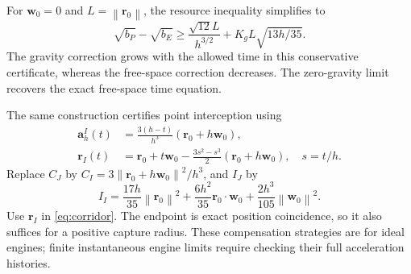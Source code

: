 \documentclass[journal,a4paper]{IEEEtran}
\newcommand{\norm}[1]{\left\|#1\right\|}
\begin{document}
For $\mathbf w_0=0$ and $L=\norm{\mathbf r_0}$, the resource inequality simplifies to
\begin{equation}
 \sqrt{b_P}-\sqrt{b_E}
 \ge\frac{\sqrt{12}L}{h^{3/2}}
       +K_gL\sqrt{13h/35}.
 \label{eq:Jkeplerrestbound}
\end{equation}
The gravity correction grows with the allowed time in this conservative certificate, whereas the free-space correction decreases. The zero-gravity limit recovers the exact free-space time equation.

The same construction certifies point interception using
\begin{align}
 \mathbf a_h^I(t)&=\frac{3(h-t)}{h^3}(\mathbf r_0+h\mathbf w_0),\nonumber\\
 \mathbf r_I(t)&=\mathbf r_0+t\mathbf w_0
 -\frac{3s^2-s^3}{2}(\mathbf r_0+h\mathbf w_0),\quad s=t/h.
 \label{eq:Irelativepath}
\end{align}
Replace $C_J$ by $C_I=3\norm{\mathbf r_0+h\mathbf w_0}^2/h^3$, and $I_J$ by
\begin{equation}
 I_I=\frac{17h}{35}\norm{\mathbf r_0}^2
      +\frac{6h^2}{35}\mathbf r_0\cdot\mathbf w_0
      +\frac{2h^3}{105}\norm{\mathbf w_0}^2.
 \label{eq:Itidalquad}
\end{equation}
Use $\mathbf r_I$ in \eqref{eq:corridor}. The endpoint is exact position coincidence, so it also suffices for a positive capture radius. These compensation strategies are for ideal engines; finite instantaneous engine limits require checking their full acceleration histories.
\end{document}
